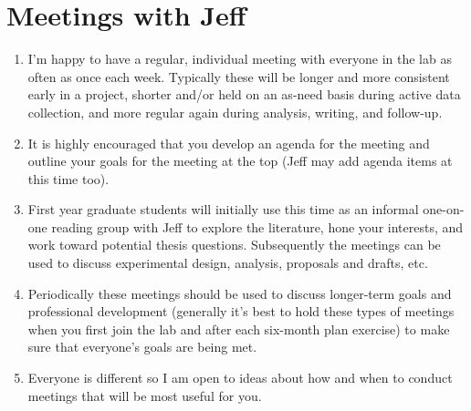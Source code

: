 \documentclass[12pt]{article}
\begin{document}
\section{Meetings with Jeff}
\begin{enumerate}
\item I'm happy to have a regular, individual meeting with everyone in the lab as often as once each week. Typically these will be longer and more consistent early in a project, shorter and/or held on an as-need basis during active data collection, and more regular again during analysis, writing, and follow-up.
\item It is highly encouraged that you develop an agenda for the meeting and outline your goals for the meeting at the top (Jeff may add agenda items at this time too). 
\item First year graduate students will initially use this time as an informal one-on-one reading group with Jeff to explore the literature, hone your interests, and work toward potential thesis questions. Subsequently the meetings can be used to discuss experimental design, analysis, proposals and drafts, etc. 
\item Periodically these meetings should be used to discuss longer-term goals and professional development (generally it's best to hold these types of meetings when you first join the lab and after each six-month plan exercise) to make sure that everyone's goals are being met.
\item Everyone is different so I am open to ideas about how and when to conduct meetings that will be most useful for you. 
  \end{enumerate}
\end{document}
